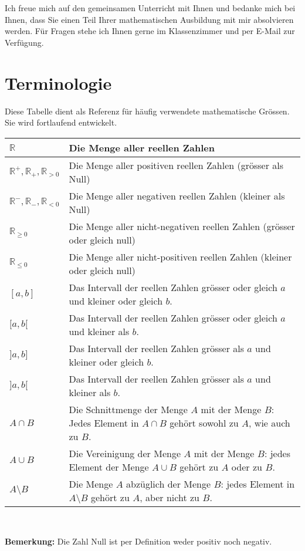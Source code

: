 \documentclass[12pt]{article}
\begin{document}
Ich freue mich auf den gemeinsamen Unterricht mit Ihnen und bedanke mich bei Ihnen, dass Sie einen Teil Ihrer mathematischen Ausbildung mit mir absolvieren werden. Für Fragen stehe ich Ihnen gerne im Klassenzimmer und per E-Mail zur Verfügung.
\newpage

\tableofcontents
\newpage
\section*{Terminologie}\label{terminologie}
Diese Tabelle dient als Referenz für häufig verwendete mathematische Grössen. Sie wird fortlaufend entwickelt.\\[1em]
{\footnotesize
\begin{tabularx}{\textwidth}{|l|X|}
\toprule
$\mathbb{R}$ & Die Menge aller reellen Zahlen\\
\hline
$\mathbb{R}^{+}, \mathbb{R}_{+}, \mathbb{R}_{>0}$ & Die Menge aller positiven reellen Zahlen ({grösser als} Null)\\
\hline
$\mathbb{R}^{-}, \mathbb{R}_{-}, \mathbb{R}_{<0}$ & Die Menge aller negativen reellen Zahlen ({kleiner als} Null)\\
\hline
$\mathbb{R}_{\geqslant 0}$ & Die Menge aller nicht-negativen reellen Zahlen (grösser oder gleich null)\\
\hline
$\mathbb{R}_{\leqslant 0}$ & Die Menge aller nicht-positiven reellen Zahlen (kleiner oder gleich null)\\
\hline
$[a,b]$ & Das Intervall der reellen Zahlen grösser oder gleich $a$ und kleiner oder gleich $b$.\\
\hline
$[a,b[$ & Das Intervall der reellen Zahlen grösser oder gleich $a$ und kleiner als $b$.\\
\hline
$]a,b]$ & Das Intervall der reellen Zahlen grösser als $a$ und kleiner oder gleich $b$.\\
\hline
$]a,b[$ & Das Intervall der reellen Zahlen grösser als $a$ und kleiner als $b$.\\
\hline
$A \cap B$ & Die Schnittmenge der Menge $A$ mit der Menge $B$: Jedes Element in $A \cap B$ gehört sowohl zu $A$, wie auch zu $B$. \\
\hline
$A \cup B$ & Die Vereinigung der Menge $A$ mit der Menge $B$: jedes Element der Menge $A \cup B$ gehört zu $A$ oder zu $B$.\\
\hline
$A \setminus B$ & Die Menge $A$ abzüglich der Menge $B$: jedes Element in $A \setminus B$ gehört zu $A$, aber nicht zu $B$.\\
\bottomrule
\end{tabularx}
\\[1em]
}
\textbf{Bemerkung:} Die Zahl Null ist per Definition weder positiv noch negativ.
\newpage
\end{document}
